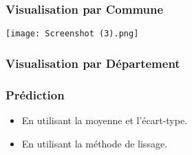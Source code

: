\documentclass{beamer}
\begin{document}
\begin{frame}  
\frametitle{Visualisation par Commune}
\begin{center}
\texttt{[image: Screenshot (3).png]}
\end{center}
\end{frame}

\begin{frame}
\frametitle{Visualisation par Département} 
\end{frame}

\begin{frame}
\frametitle{Prédiction}
\begin{itemize}
    \item En utilisant la moyenne et l'écart-type.
    \item En utilisant la méthode de lissage.
\end{itemize}
\end{frame}
\end{document}
